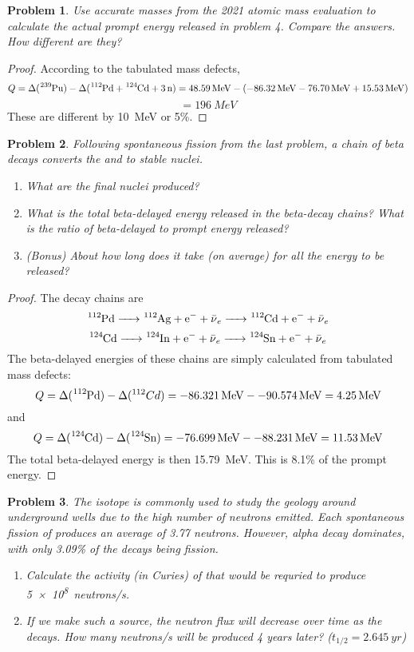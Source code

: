 \documentclass{article}
\newtheorem{plm}{Problem}
\begin{document}
\begin{plm}
  Use \textit{accurate} masses from the 2021 atomic mass evaluation to calculate the actual prompt energy released in problem 4.
  Compare the answers.
  How different are they?
\end{plm}

\begin{proof}
  According to the tabulated mass defects,
  \[
     Q = \Delta(\ce{^{239}Pu}) - \Delta(\ce{^{112}Pd + ^{124}Cd + 3n})
     = \SI{48.59}{MeV} - (\SI{-86.32}{MeV} - \SI{76.70}{MeV} + \SI{15.53}{MeV})
   \]
   \[
     = \SI{196}{MeV}
   \]
   These are different by \SI{10}{MeV} or 5\%.
\end{proof}

\begin{plm}
  Following spontaneous fission from the last problem, a chain of beta decays converts the  and  to stable nuclei.
  \begin{enumerate}
  \item What are the final nuclei produced?
  \item What is the total beta-delayed energy released in the beta-decay chains?
    What is the ratio of beta-delayed to prompt energy released?
  \item (Bonus) About how long does it take (on average) for all the energy to be released?
  \end{enumerate}
\end{plm}

\begin{proof}
  The decay chains are
  \[
    \ce{^{112}Pd -> ^{112}Ag + e^{-} + \bar{\nu}_{e} ->  ^{112}Cd + e^{-} + \bar{\nu}_{e}}
  \]
  \[
    \ce{^{124}Cd -> ^{124}In + e^{-} + \bar{\nu}_{e} -> ^{124}Sn + e^{-} + \bar{\nu}_{e}}
  \]
  The beta-delayed energies of these chains are simply calculated from tabulated mass defects:
  \[
    Q = \Delta(\ce{^{112}Pd}) - \Delta(^{112}Cd) = \SI{-86.321}{MeV} - \SI{-90.574}{MeV} = \SI{4.25}{MeV}
  \]
  and
  \[
    Q = \Delta(\ce{^{124}Cd}) - \Delta(\ce{^{124}Sn}) = \SI{-76.699}{MeV} - \SI{-88.231}{MeV} = \SI{11.53}{MeV}
  \]
  The total beta-delayed energy is then \SI{15.79}{MeV}.
  This is 8.1\% of the prompt energy.
\end{proof}

\begin{plm}
  The isotope  is commonly used to study the geology around underground wells due to the high number of neutrons emitted.
  Each spontaneous fission of  produces an average of 3.77 neutrons.
  However, alpha decay dominates, with only 3.09\% of the decays being fission.
  \begin{enumerate}
  \item Calculate the activity (in Curies) of  that would be requried to produce \SI{5e8}{neutrons/s}.
  \item If we make such a source, the neutron flux will decrease over time as the  decays.
    How many \si{neutrons/s} will be produced 4 years later? ($t_{1/2} = \SI{2.645}{yr}$)
  \end{enumerate}
\end{plm}
\end{document}
